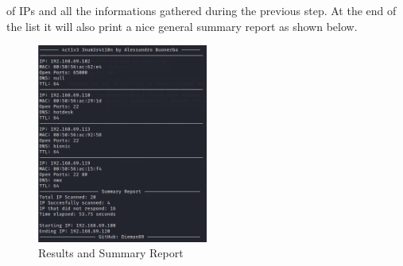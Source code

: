 of IPs and all the informations gathered during the previous step. At the end of
the list it will also print a nice general summary report as shown below.
\begin{figure}[H]
  \centering
  \includegraphics[width=0.5\textwidth]{figures/result-active-enum}
  \caption{Results and Summary Report}
  \label{f:result-active-enum}
\end{figure}

